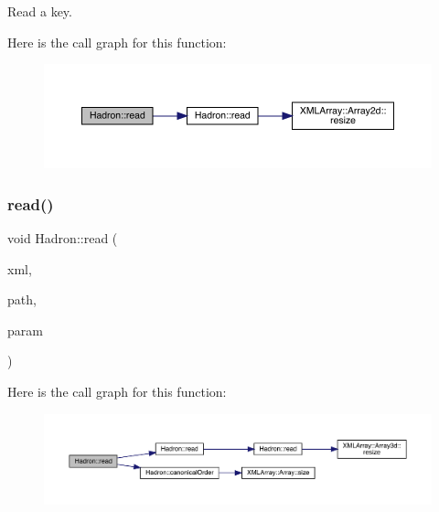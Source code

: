 Read a key. 

Here is the call graph for this function\+:
\nopagebreak
\begin{figure}[H]
\begin{center}
\leavevmode
\includegraphics[width=350pt]{d1/daf/namespaceHadron_a9c6649bbe7b32cbc5fcbf8ebbf17d987_cgraph}
\end{center}
\end{figure}
\mbox{\label{namespaceHadron_ab955c28b5566e0df089a26a611d4bf03}} 
\subsubsection{\texorpdfstring{read()}{read()}\hspace{0.1cm}{\footnotesize\ttfamily [31/94]}}
{\footnotesize\ttfamily void Hadron\+::read (\begin{DoxyParamCaption}\item[{\mbox{\hyperlink{classADATXML_1_1XMLReader}{X\+M\+L\+Reader}} \&}]{xml,  }\item[{const std\+::string \&}]{path,  }\item[{\mbox{\hyperlink{structHadron_1_1KeyHadronNPartIrrepOp__t_1_1CGPair__t_1_1Slot__t}{Key\+Hadron\+N\+Part\+Irrep\+Op\+\_\+t\+::\+C\+G\+Pair\+\_\+t\+::\+Slot\+\_\+t}} \&}]{param }\end{DoxyParamCaption})}

Here is the call graph for this function\+:
\nopagebreak
\begin{figure}[H]
\begin{center}
\leavevmode
\includegraphics[width=350pt]{d1/daf/namespaceHadron_ab955c28b5566e0df089a26a611d4bf03_cgraph}
\end{center}
\end{figure}
\mbox{\label{namespaceHadron_a067d20ab6ec9071306d6db3a7e7cb4fd}} 

